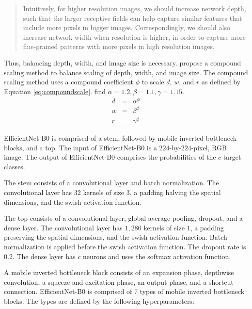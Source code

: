 %
\blockquote[\cite{Tan.2019}]{Intuitively, for higher resolution images, we should increase network depth, such that the larger receptive fields can help capture similar features that include more pixels in bigger images. Correspondingly, we should also increase network width when resolution is higher, in order to capture more fine-grained patterns with more pixels in high resolution images.}
%
Thus, balancing depth, width, and image size is necessary.
\cite{Tan.2019} propose a compound scaling method to balance scaling of depth, width, and image size. The compound scaling method uses a compound coefficient $\phi$ to scale $d$, $w$, and $r$ as defined by Equation \eqref{eq:compoundscale}. \cite{Tan.2019} find $\alpha= 1.2, \beta=1.1, \gamma= 1.15$.\autocite{Tan.2019}
\begin{equation}
	\label{eq:compoundscale}
	\begin{array}{lcl}
		d & = & \alpha^\phi\\
		w & = & \beta^\phi\\
		r & = & \gamma^\phi
	\end{array}
\end{equation}
\par %
EfficientNet-B0 is comprised of a stem, followed by mobile inverted bottleneck blocks, and a top.
The input of EfficientNet-B0 is a $224$-by-$224$-pixel, \ac{RGB} image. The output of EfficientNet-B0 comprises the probabilities of the $c$ target classes. \autocite{Tan.2019}
\par %
The stem consists of a convolutional layer and batch normalization. The convolutional layer has $32$ kernels of size $3$, a padding halving the spatial dimensions, and the swish activation function. \autocite{Tan.2019}
\par %
The top consists of a convolutional layer, global average pooling, dropout, and a dense layer. The convolutional layer has $1{,}280$ kernels of size $1$, a padding preserving the spatial dimensions, and the swish activation function. Batch normalization is applied before the swish activation function. The dropout rate is $0.2$. The dense layer has $c$ neurons and uses the softmax activation function. \autocite{Tan.2019}
\par %
A mobile inverted bottleneck block consists of an expansion phase, depthwise convolution, a squeeze-and-excitation phase, an output phase, and a shortcut connection. EfficientNet-B0 is comprised of $7$ types of mobile inverted bottleneck blocks. The types are defined by the following hyperparameters: \autocite{Tan.2019}
